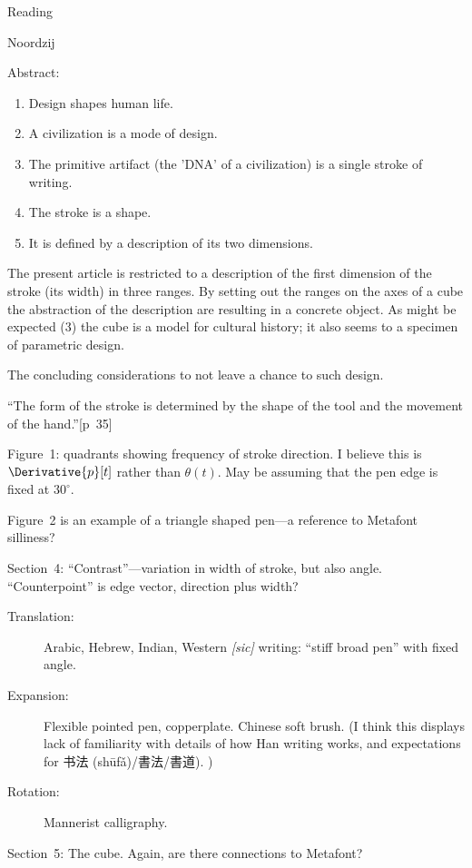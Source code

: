 \documentclass[11pt]{PalisadesLakesBook}
\begin{document}
\begin{plSection}{Reading}
\begin{plSection}{Noordzij}
\begin{plQuote}{}{}
Abstract:
\begin{enumerate}
  \item Design shapes human life.
  \item A civilization is a mode of design.
  \item The primitive artifact (the 'DNA' of a civilization)
  is a single stroke of writing.
  \item The stroke is a shape.
  \item It is defined by a description of its two dimensions.
\end{enumerate}
The present article is restricted to a description of the first
dimension of the stroke (its width) in three ranges.
By setting out the ranges on the axes of a cube
the abstraction of the description are resulting 
in a concrete object.
As might be expected (3) the cube is a model for
cultural history;
it also seems to a specimen of parametric design.
\par
The concluding considerations to not leave a chance to such design.
\end{plQuote}%

``The form of the stroke is determined by the shape of the tool
and the movement of the hand.''[p~35]

Figure~1: quadrants showing frequency of stroke direction.
I believe this is $\Derivative{p}[t]$ rather than $\theta(t)$.
May be  assuming that the pen edge is fixed at
$30^{\circ}$.

Figure~2 is an example of a triangle shaped pen---a reference to
Metafont silliness?

Section~4: ``Contrast''---variation in width of stroke, 
but also angle.
``Counterpoint'' is edge vector, direction plus width?
\begin{description}
\item[Translation:] Arabic, Hebrew, Indian, Western \emph{[sic]}
 writing: ``stiff broad pen'' with fixed angle.
 \item[Expansion:] Flexible pointed pen, copperplate.
 Chinese soft brush. 
 (I think this displays lack of familiarity 
 with details of how Han writing works, and expectations for
 书法 (shūfǎ)/書法/書道). )
 \item[Rotation:] Mannerist calligraphy.
\end{description}

Section~5: The cube. Again, are there connections to Metafont?


\end{plSection}
\end{plSection}
\end{document}
